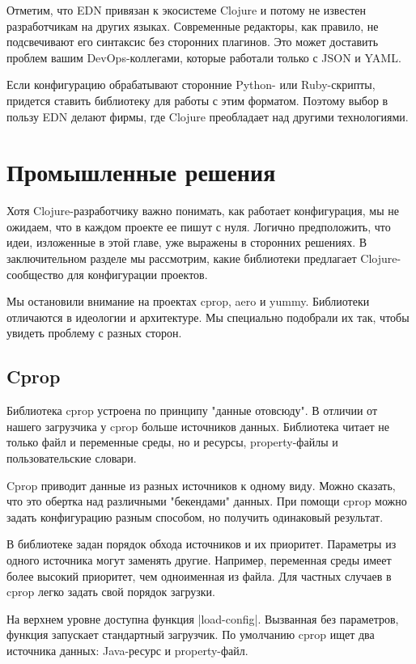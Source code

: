 Отметим, что EDN привязан к экосистеме Clojure и потому не известен
разработчикам на других языках. Современные редакторы, как правило, не
подсвечивают его синтаксис без сторонних плагинов. Это может доставить проблем
вашим DevOps-коллегами, которые работали только с JSON и YAML.

Если конфигурацию обрабатывают сторонние Python- или Ruby-скрипты, придется
ставить библиотеку для работы с этим форматом. Поэтому выбор в пользу EDN делают
фирмы, где Clojure преобладает над другими технологиями.

\section{Промышленные решения}

Хотя Clojure-разработчику важно понимать, как работает конфигурация, мы не
ожидаем, что в каждом проекте ее пишут с нуля. Логично предположить, что идеи,
изложенные в этой главе, уже выражены в сторонних решениях. В заключительном
разделе мы рассмотрим, какие библиотеки предлагает Clojure-сообщество для
конфигурации проектов.

Мы остановили внимание на проектах cprop, aero и yummy. Библиотеки отличаются в
идеологии и архитектуре. Мы специально подобрали их так, чтобы увидеть проблему
с разных сторон.

\subsection{Cprop}

Библиотека cprop устроена по принципу "данные отовсюду". В отличии от нашего
загрузчика у cprop больше источников данных. Библиотека читает не только файл и
переменные среды, но и ресурсы, property-файлы и пользовательские словари.

Cprop приводит данные из разных источников к одному виду. Можно сказать, что это
обертка над различными "бекендами" данных. При помощи cprop можно задать
конфигурацию разным способом, но получить одинаковый результат.

В библиотеке задан порядок обхода источников и их приоритет. Параметры из одного
источника могут заменять другие. Например, переменная среды имеет более высокий
приоритет, чем одноименная из файла. Для частных случаев в cprop легко задать
свой порядок загрузки.

На верхнем уровне доступна функция \spverb|load-config|. Вызванная без параметров,
функция запускает стандартный загрузчик. По умолчанию cprop ищет два источника
данных: Java-ресурс и property-файл.

